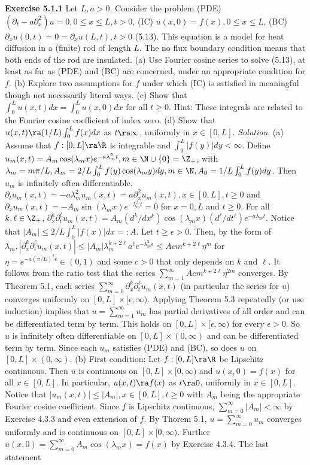 {\bf Exercise 5.1.1} Let $L, a >0$. Consider the problem (PDE) $(\partial_t - a \partial_x^2)u = 0, 0 \leq x \leq L, t > 0$, (IC) $u(x,0)=f(x), 0 \leq x \leq L$, (BC) $\partial_xu(0,t)=0=\partial_xu(L,t), t > 0$ (5.13). This equation is a model for heat diffusion in a (finite) rod of length $L$. The no flux boundary condition means that both ends of the rod are insulated.  (a) Use Fourier cosine series to solve (5.13), at least as far as (PDE) and (BC) are concerned, under an appropriate condition for $f$. (b) Explore two assumptions for $f$ under which (IC) is satisfied in meaningful though not necessarily literal ways. (c) Show that $\int_0^L u(x,t)dx = \int_0^L u(x,0)dx$ for all $t \geq 0$.  Hint: These integrals are related to the Fourier cosine coefficient of index zero.  (d) Show that $u(x,t) \ra (1/L)\int_0^L f(x)dx$ as $t \ra \infty$, uniformly in $x \in [0,L]$. {\it Solution}. (a) Assume that $f: [0,L] \ra \R$ is integrable and $\int_0^L|f(y)|dy < \infty$. Define $u_m(x,t) = A_m \cos(\lambda_mx)e^{-a \lambda_m^2 t}, m \in \N \cup \{0\} = \Z_+$, with $\lambda_m = m\pi/L, A_m=2/L\int_0^L f(y) \cos(\lambda_my)dy, m \in \N, A_0=1/L\int_0^Lf(y)dy$. Then $u_m$ is infinitely often differentiable, $\partial_t u_m(x,t) = -a \lambda_m^2 u_m(x,t) = a \partial_x^2 u_m(x,t), x \in [0,L], t \geq 0$ and $\partial_x u_m(x,t) = -A_m \sin(\lambda_mx) e^{-\lambda_m^2 t} = 0$ for $x = 0, L$ and $ t \geq 0$. For all $k, \ell \in \Z_+$, $\partial_x^k \partial_t^{\ell} u_m(x,t) = A_m(d^k/dx^k)\cos(\lambda_mx)(d^{\ell}/dt^{\ell})e^{-a \lambda_m t}$. Notice that $|A_m| \leq 2/L \int_0^L |f(x)|dx =: A$. Let $t \geq \epsilon >0$. Then, by the form of $\lambda_m, |\partial_x^k \partial_t^{\ell} u_m(x,t)| \leq |A_m|\lambda_m^{k+2\ell}a^{\ell}e^{-\lambda_m^2 \epsilon} \leq A c m^{k+2 \ell} \eta^m$ for $\eta = e^{-a(\pi/L)^2 \epsilon} \in (0,1)$ and some $c >0$ that only depends on $k$ and $\ell$. It follows from the ratio test that the series $\sum_{m=1}^{\infty} A c m^{k+2 \ell} \eta^{2m}$ converges. By Theorem 5.1, each series $\sum_{m=0}^{\infty}\partial_x^k \partial_t^{\ell} u_m(x,t)$ (in particular the series for $u$) converges uniformly on $[0,L] \times [ \epsilon, \infty)$. Applying Theorem 5.3 repeatedly (or use induction) implies that $u = \sum_{m=1}^{\infty} u_m$ has partial derivatives of all order and can be differentiated term by term.  This holds on $[0,L] \times [\epsilon, \infty)$ for every $\epsilon >0$. So $u$ is infinitely often differentiable on $[0,L] \times (0, \infty)$ and can be differentiated term by term. Since each $u_m$ satisfies (PDE) and (BC), so does $u$ on $[0,L] \times (0, \infty)$. (b) First condition:  Let $f: [0,L] \ra \R$ be Lipschitz continuous. Then $u$ is continuous on $[0,L] \times [0, \infty)$ and $u(x,0) = f(x)$ for all $x \in [0,L]$. In particular, $u(x,t) \ra f(x)$ as $t \ra 0$, uniformly in $x \in [0,L]$. Notice that $|u_m(x,t)| \leq |A_m|, x \in [0,L], t \geq 0$ with $A_m$ being the appropriate Fourier cosine coefficient. Since $f$ is Lipschitz continuous, $\sum_{m=0}^{\infty} |A_m| < \infty$ by Exercise 4.3.3 and even extension of $f$. By Thorem 5.1, $u = \sum_{m=0}^{\infty}u_m$ converges uniformly and is continuous on $[0,L] \times [0, \infty)$. Further $u(x,0)= \sum_{m=0}^{\infty} A_m \cos(\lambda_mx)=f(x)$ by Exercise 4.3.4. The last statement 